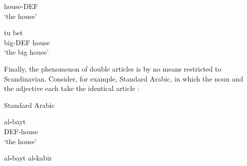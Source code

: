 house-DEF\\

\glt ‘the house’

\z

\item 


 \ea\label{}
\gll tu  bet\\


big-DEF  house\\

\glt ‘the big house’

\z

Finally, the phenomenon of double articles is by no means restricted to Scandinavian. Consider, for example, Standard Arabic, in which the noun and the adjective each take the identical article :


\item 

Standard Arabic



\item 


 \ea\label{}
\gll al\textbf{{}-}bayt\\


DEF-house\\

\glt ‘the house’

\z

\item 


 \ea\label{}
\gll al\textbf{{}-}bayt  al\textbf{{}-}kabir\\


